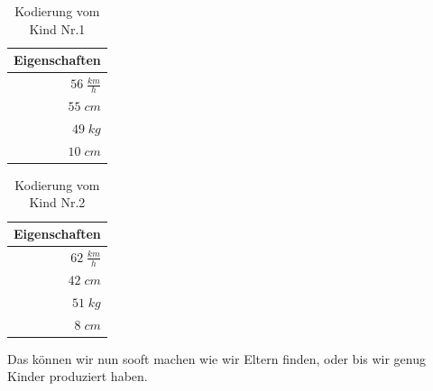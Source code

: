            \begin{multicols}{2}
                \begin{table}[H]
                    \begin{center}
                    \begin{tabular}{ |r| } 
                        \hline
                        \hfill Eigenschaften  \\ \hline
                        \cellcolor{blue!25}   $ 56\; \frac{km}{h}$ \\ \hline
                        \cellcolor{yellow!25} $ 55\; cm          $ \\ \hline
                        \cellcolor{yellow!25} $ 49\; kg          $ \\ \hline
                        \cellcolor{blue!25}   $ 10\; cm          $ \\ \hline
                    \end{tabular}
                    \end{center}
                    \caption{Kodierung vom Kind Nr.1 \label{fig:child-1}}
                \end{table}


                \begin{table}[H]
                    \begin{center}
                    \begin{tabular}{ |r| } 
                        \hline
                        \hfill Eigenschaften  \\ \hline
                        \cellcolor{yellow!25} $ 62\; \frac{km}{h}$ \\ \hline
                        \cellcolor{blue!25}   $ 42\; cm          $ \\ \hline
                        \cellcolor{blue!25}   $ 51\; kg          $ \\ \hline
                        \cellcolor{yellow!25} $  8\; cm          $ \\ \hline
                    \end{tabular}
                    \end{center}
                    \caption{Kodierung vom Kind Nr.2 \label{fig:child-2}}
                \end{table}
            \end{multicols}
            \noindent
            Das können wir nun sooft machen wie wir Eltern finden, oder bis wir genug Kinder produziert haben.

